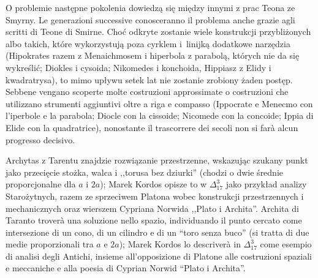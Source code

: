O problemie następne pokolenia dowiedzą się między innymi z prac Teona ze Smyrny. %
Le generazioni successive conosceranno il problema anche grazie agli scritti di Teone di Smirne. %
Choć odkryte zostanie wiele konstrukcji przybliżonych albo takich, które wykorzystują poza cyrklem i~linijką dodatkowe narzędzia (Hipokrates razem z Menaichmosem i hiperbola z parabolą, których nie da się wykreślić; Diokles i cysoida; Nikomedes i konchoida, Hippiasz z Elidy i kwadratrysa), to mimo upływu setek lat nie zostanie zrobiony żaden postęp. %
Sebbene vengano scoperte molte costruzioni approssimate o costruzioni che utilizzano strumenti aggiuntivi oltre a riga e compasso (Ippocrate e Menecmo con l'iperbole e la parabola; Diocle con la cissoide; Nicomede con la concoide; Ippia di Elide con la quadratrice), nonostante il trascorrere dei secoli non si farà alcun progresso decisivo. %
%

Archytas z Tarentu znajdzie rozwiązanie przestrzenne, wskazując szukany punkt jako przecięcie stożka, walca i ,,torusa bez dziurki'' (chodzi o dwie średnie proporcjonalne dla $a$ i $2a$); Marek Kordos opisze to w $\Delta_{17}^{3}$ jako przykład analizy Starożytnych, razem ze sprzeciwem Platona wobec konstrukcji przestrzennych i mechanicznych oraz wierszem Cypriana Norwida ,,Plato i Archita''. %
Archita di Taranto troverà una soluzione nello spazio, individuando il punto cercato come intersezione di un cono, di un cilindro e di un ``toro senza buco'' (si tratta di due medie proporzionali tra $a$ e $2a$); Marek Kordos lo descriverà in $\Delta_{17}^{3}$ come esempio di analisi degli Antichi, insieme all'opposizione di Platone alle costruzioni spaziali e meccaniche e alla poesia di Cyprian Norwid ``Plato i Archita''. %

